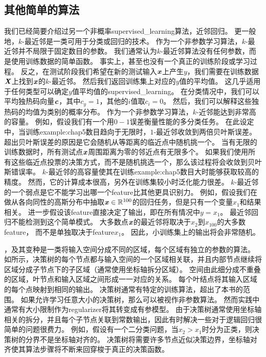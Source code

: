 \subsection{其他简单的算法}
\label{sec:other_simple_supervised_learning_algorithms}
我们已经简要介绍过另一个非概率\gls{supervised_learning}算法，近邻回归。
更一般地，$k$-最近邻是一类可用于分类或回归的技术。
作为一个非参数学习算法，$k$-最近邻并不局限于固定数目的参数。
我们通常认为$k$-最近邻算法没有任何参数，而是使用训练数据的简单函数。
事实上，甚至也没有一个真正的训练阶段或学习过程。
反之，在测试阶段我们希望在新的测试输入$\boldsymbol{\mathit{x}}$上产生$y$，我们需要在训练数据$\boldsymbol{\mathit{X}}$上找到$\boldsymbol{\mathit{x}}$的$k$-最近邻。
然后我们返回训练集上对应的$y$值的平均值。
这几乎适用于任何类型可以确定$y$值平均值的\gls{supervised_learning}。
在分类情况中，我们可以平均独热码向量$\boldsymbol{\mathit{c}}$，其中$c_y = 1$，其他的$i$值取$c_i=0$。
然后，我们可以解释这些独热码的均值为类别的概率分布。
作为一个非参数学习算法，$k$-近邻能达到非常高的容量。
例如，假设我们有一个用$0-1$误差衡量性能的多分类任务。
在此设定中，当训练\gls{example:chap5}数目趋向于无限时，$1$-最近邻收敛到两倍贝叶斯误差。
超出贝叶斯误差的原因是它会随机从等距离的临近点中随机挑一个。
当有无限的训练数据时，所有测试点$\boldsymbol{\mathit{x}}$周围距离为零的邻近点有无限多个。
如果我们使用所有这些临近点投票的决策方式，而不是随机挑选一个，那么该过程将会收敛到贝叶斯错误率。
$k$-最近邻的高容量使其在训练\gls{example:chap5}数目大时能够获取较高的精度。
然而，它的计算成本很高，另外在训练集较小时泛化能力很差。
$k$-最近邻的一个弱点是它不能学习出哪一个\gls{feature}比其他更具识别力。
例如，假设我们在做从各向同性的高斯分布中抽取$\boldsymbol{\mathit{x}}\in\mathbb{R}^{100}$的回归任务，但是只有一个变量$x_1$和结果相关。
进一步假设该\gls{feature}直接决定了输出，即在所有情况中$y=x_1$。
最近邻回归不能检测到这个简单模式。
大多数点$\boldsymbol{\mathit{x}}$的最近邻将取决于$x_2$到$x_{100}$的大多数\gls{feature}，
而不是单独取决于\gls{feature}$x_1$。
因此，小训练集上的输出将会非常随机。


，及其变种是一类将输入空间分成不同的区域，每个区域有独立的参数的算法\citep{Breiman84}。
如所示，决策树的每个节点都与输入空间的一个区域相关联，并且内部节点继续将区域分成子节点下的子区域（通常使用坐标轴拆分区域）。
空间由此细分成不重叠的区域，叶节点和输入区域之间形成一一对应的关系。
每个叶结点将其输入区域的每个点映射到相同的输出。
决策树通常有特定的训练算法，超出了本书的范围。
如果允许学习任意大小的决策树，那么可以被视作非参数算法。
然而实践中通常有大小限制作为\gls{regularizer}将其转变成有参模型。
由于决策树通常使用坐标轴相关的拆分，并且每个子节点关联到常数输出，因此有时解决一些对于逻辑回归很简单的问题很费力。
例如，假设有一个二分类问题，当$x_2>x_1$时分为正类，则决策树的分界不是坐标轴对齐的。
决策树将需要许多节点近似决策边界，坐标轴对齐使其算法步骤将不断来回穿梭于真正的决策函数。

